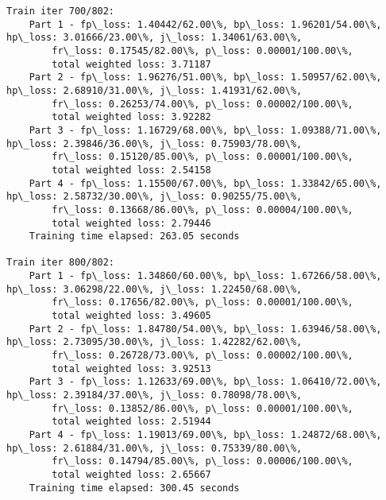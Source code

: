 \documentclass[11pt]{article}
\begin{document}
\begin{Verbatim}[commandchars=\\\{\}]
Train iter 700/802:
	Part 1 - fp\_loss: 1.40442/62.00\%, bp\_loss: 1.96201/54.00\%, hp\_loss: 3.01666/23.00\%, j\_loss: 1.34061/63.00\%, 
		fr\_loss: 0.17545/82.00\%, p\_loss: 0.00001/100.00\%, 
		total weighted loss: 3.71187
	Part 2 - fp\_loss: 1.96276/51.00\%, bp\_loss: 1.50957/62.00\%, hp\_loss: 2.68910/31.00\%, j\_loss: 1.41931/62.00\%, 
		fr\_loss: 0.26253/74.00\%, p\_loss: 0.00002/100.00\%, 
		total weighted loss: 3.92282
	Part 3 - fp\_loss: 1.16729/68.00\%, bp\_loss: 1.09388/71.00\%, hp\_loss: 2.39846/36.00\%, j\_loss: 0.75903/78.00\%, 
		fr\_loss: 0.15120/85.00\%, p\_loss: 0.00001/100.00\%, 
		total weighted loss: 2.54158
	Part 4 - fp\_loss: 1.15500/67.00\%, bp\_loss: 1.33842/65.00\%, hp\_loss: 2.58732/30.00\%, j\_loss: 0.90255/75.00\%, 
		fr\_loss: 0.13668/86.00\%, p\_loss: 0.00004/100.00\%, 
		total weighted loss: 2.79446
	Training time elapsed: 263.05 seconds

Train iter 800/802:
	Part 1 - fp\_loss: 1.34860/60.00\%, bp\_loss: 1.67266/58.00\%, hp\_loss: 3.06298/22.00\%, j\_loss: 1.22450/68.00\%, 
		fr\_loss: 0.17656/82.00\%, p\_loss: 0.00001/100.00\%, 
		total weighted loss: 3.49605
	Part 2 - fp\_loss: 1.84780/54.00\%, bp\_loss: 1.63946/58.00\%, hp\_loss: 2.73095/30.00\%, j\_loss: 1.42282/62.00\%, 
		fr\_loss: 0.26728/73.00\%, p\_loss: 0.00002/100.00\%, 
		total weighted loss: 3.92513
	Part 3 - fp\_loss: 1.12633/69.00\%, bp\_loss: 1.06410/72.00\%, hp\_loss: 2.39184/37.00\%, j\_loss: 0.78098/78.00\%, 
		fr\_loss: 0.13852/86.00\%, p\_loss: 0.00001/100.00\%, 
		total weighted loss: 2.51944
	Part 4 - fp\_loss: 1.19013/69.00\%, bp\_loss: 1.24872/68.00\%, hp\_loss: 2.61884/31.00\%, j\_loss: 0.75339/80.00\%, 
		fr\_loss: 0.14794/85.00\%, p\_loss: 0.00006/100.00\%, 
		total weighted loss: 2.65667
	Training time elapsed: 300.45 seconds


\end{Verbatim}
\end{document}
